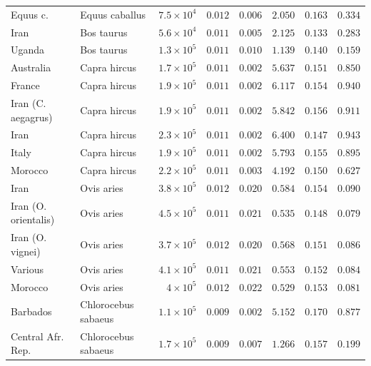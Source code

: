 \documentclass{article}
\begin{document}
\begin{center}
\begin{longtable*}{|l|l|r|r|r|r|r|r|}
            \bottomrule
            \endlastfoot
             Equus c. & Equus caballus & $7.5\times 10^{4}$ & $ 0.012$ & $ 0.006$ & $ 2.050$ & $ 0.163$ & $ 0.334$ \\
            Iran & Bos taurus & $5.6\times 10^{4}$ & $ 0.011$ & $ 0.005$ & $ 2.125$ & $ 0.133$ & $ 0.283$ \\
            Uganda & Bos taurus & $1.3\times 10^{5}$ & $ 0.011$ & $ 0.010$ & $ 1.139$ & $ 0.140$ & $ 0.159$ \\
             Australia & Capra hircus & $1.7\times 10^{5}$ & $ 0.011$ & $ 0.002$ & $ 5.637$ & $ 0.151$ & $ 0.850$ \\
             France & Capra hircus & $1.9\times 10^{5}$ & $ 0.011$ & $ 0.002$ & $ 6.117$ & $ 0.154$ & $ 0.940$ \\
             Iran (C. aegagrus) & Capra hircus & $1.9\times 10^{5}$ & $ 0.011$ & $ 0.002$ & $ 5.842$ & $ 0.156$ & $ 0.911$ \\
             Iran & Capra hircus & $2.3\times 10^{5}$ & $ 0.011$ & $ 0.002$ & $ 6.400$ & $ 0.147$ & $ 0.943$ \\
             Italy & Capra hircus & $1.9\times 10^{5}$ & $ 0.011$ & $ 0.002$ & $ 5.793$ & $ 0.155$ & $ 0.895$ \\
             Morocco & Capra hircus & $2.2\times 10^{5}$ & $ 0.011$ & $ 0.003$ & $ 4.192$ & $ 0.150$ & $ 0.627$ \\
            Iran & Ovis aries & $3.8\times 10^{5}$ & $ 0.012$ & $ 0.020$ & $ 0.584$ & $ 0.154$ & $ 0.090$ \\
            Iran (O. orientalis) & Ovis aries & $4.5\times 10^{5}$ & $ 0.011$ & $ 0.021$ & $ 0.535$ & $ 0.148$ & $ 0.079$ \\
            Iran (O. vignei) & Ovis aries & $3.7\times 10^{5}$ & $ 0.012$ & $ 0.020$ & $ 0.568$ & $ 0.151$ & $ 0.086$ \\
            Various & Ovis aries & $4.1\times 10^{5}$ & $ 0.011$ & $ 0.021$ & $ 0.553$ & $ 0.152$ & $ 0.084$ \\
            Morocco & Ovis aries & $ 4\times 10^{5}$ & $ 0.012$ & $ 0.022$ & $ 0.529$ & $ 0.153$ & $ 0.081$ \\
             Barbados & Chlorocebus sabaeus & $1.1\times 10^{5}$ & $ 0.009$ & $ 0.002$ & $ 5.152$ & $ 0.170$ & $ 0.877$ \\
             Central Afr. Rep. & Chlorocebus sabaeus & $1.7\times 10^{5}$ & $ 0.009$ & $ 0.007$ & $ 1.266$ & $ 0.157$ & $ 0.199$ \\

\end{longtable*}
\end{center}
\end{document}
